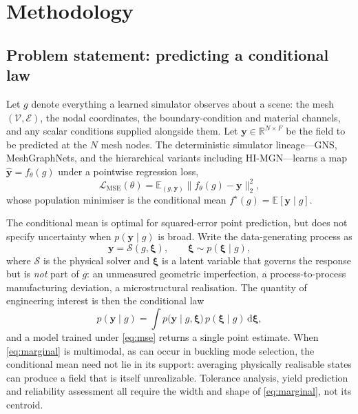 
\section{Methodology}
\label{sec:method}

\subsection{Problem statement: predicting a conditional law}
\label{sec:method:problem}

Let $g$ denote everything a learned simulator observes about a scene: the mesh
$(\mathcal{V},\mathcal{E})$, the nodal coordinates, the boundary-condition and
material channels, and any scalar conditions supplied alongside them. Let
$\mathbf{y}\in\mathbb{R}^{N\times F}$ be the field to be predicted at the $N$
mesh nodes. The deterministic simulator lineage---GNS, MeshGraphNets, and the
hierarchical variants including HI-MGN---learns a map $\hat{\mathbf{y}} =
f_\theta(g)$ under a pointwise regression loss,
\begin{equation}
  \mathcal{L}_{\mathrm{MSE}}(\theta)
  = \mathbb{E}_{(g,\mathbf{y})}\bigl\|f_\theta(g)-\mathbf{y}\bigr\|_2^2 ,
  \label{eq:mse}
\end{equation}
whose population minimiser is the conditional mean
$f^\star(g)=\mathbb{E}[\mathbf{y}\mid g]$.

The conditional mean is optimal for squared-error point prediction, but does
not specify uncertainty when $p(\mathbf{y}\mid g)$ is broad. Write the data-generating
process as
\begin{equation}
  \mathbf{y} = \mathcal{S}(g,\boldsymbol{\xi}),
  \qquad \boldsymbol{\xi}\sim p(\boldsymbol{\xi}\mid g),
  \label{eq:generative}
\end{equation}
where $\mathcal{S}$ is the physical solver and $\boldsymbol{\xi}$ is a latent
variable that governs the response but is \emph{not} part of $g$: an
unmeasured geometric imperfection, a process-to-process manufacturing
deviation, a microstructural realisation. The quantity of engineering interest
is then the conditional law
\begin{equation}
  p(\mathbf{y}\mid g)
  = \int p\bigl(\mathbf{y}\mid g,\boldsymbol{\xi}\bigr)\,
         p(\boldsymbol{\xi}\mid g)\,\mathrm{d}\boldsymbol{\xi},
  \label{eq:marginal}
\end{equation}
and a model trained under \eqref{eq:mse} returns a single point estimate.
When \eqref{eq:marginal} is multimodal, as can occur in buckling mode
selection, the conditional mean need not lie in its support: averaging
physically realisable states can produce a field that is itself unrealizable. Tolerance
analysis, yield prediction and reliability assessment all require the width and
shape of \eqref{eq:marginal}, not its centroid.

